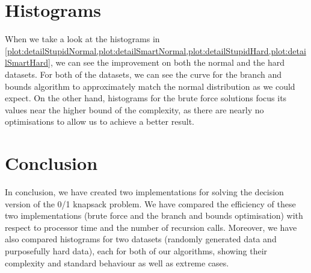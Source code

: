 




\section{Histograms}
When we take a look at the histograms in \cref{plot:detailStupidNormal,plot:detailSmartNormal,plot:detailStupidHard,plot:detailSmartHard}, we can see the improvement on both the normal and the hard datasets. For both of the datasets, we can see the curve for the branch and bounds algorithm to approximately match the normal distribution as we could expect. On the other hand, histograms for the brute force solutions focus its values near the higher bound of the complexity, as there are nearly no optimisations to allow us to achieve a better result.



\section{Conclusion}
In conclusion, we have created two implementations for solving the decision version of the 0/1 knapsack problem. We have compared the efficiency of these two implementations (brute force and the branch and bounds optimisation) with respect to processor time and the number of recursion calls. Moreover, we have also compared histograms for two datasets (randomly generated data and purposefully hard data), each for both of our algorithms, showing their complexity and standard behaviour as well as extreme cases.

\newpage

% 
% 
\nocite{*} %


